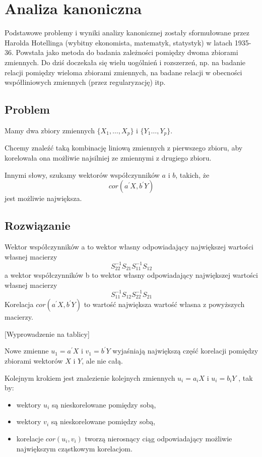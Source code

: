 \documentclass[polish,]{book}
\begin{document}
\hypertarget{part_5}{%
\chapter{Analiza kanoniczna}\label{part_5}}

Podstawowe problemy i wyniki analizy kanonicznej zostały sformułowane przez Harolda Hotellinga (wybitny ekonomista, matematyk, statystyk) w latach 1935-36.
Powstała jako metoda do badania zależności pomiędzy dwoma zbiorami zmiennych.
Do dziś doczekała się wielu uogólnień i rozszerzeń, np. na badanie relacji pomiędzy wieloma zbiorami zmiennych, na badane relacji w obecności współliniowych
zmiennych (przez regularyzację) itp.

\hypertarget{part_51}{%
\section{Problem}\label{part_51}}

Mamy dwa zbiory zmiennych \(\{X_1,\dots,X_p\}\) i \(\{Y_1\dots,Y_p\}\).

Chcemy znaleźć taką kombinację liniową zmiennych z pierwszego zbioru, aby
korelowała ona możliwie najsilniej ze zmiennymi z drugiego zbioru.

Innymi słowy, szukamy wektorów współczynników \(a\) i \(b\), takich, że
\[cor(a^{\prime}X,b^{\prime}Y)\]
jest możliwie największa.

\hypertarget{part_52}{%
\section{Rozwiązanie}\label{part_52}}

Wektor współczynników a to wektor własny odpowiadający największej wartości
własnej macierzy
\[S^{-1}_{22}S_{21}S^{-1}_{11}S_{12}\]
a wektor współczynników b to wektor własny odpowiadający największej wartości
własnej macierzy
\[S^{-1}_{11}S_{12}S^{-1}_{22}S_{21}\]
Korelacja \(cor(a^{\prime}X,b^{\prime}Y)\) to wartość największa wartość własna z powyższych macierzy.

{[}Wyprowadzenie na tablicy{]}

Nowe zmienne \(u_1=a^{\prime}X\) i \(v_1=b^{\prime}Y\) wyjaśniają największą część korelacji pomiędzy zbiorami wektorów \(X\) i \(Y\), ale nie całą.

Kolejnym krokiem jest znalezienie kolejnych zmiennych \(u_i=a_{i}X\) i \(u_i=b_iY\) , tak by:

\begin{itemize}
\item
  wektory \(u_i\) są nieskorelowane pomiędzy sobą,
\item
  wektory \(v_i\) są nieskorelowane pomiędzy sobą,
\item
  korelacje \(cor(u_i,v_i)\) tworzą nierosnący ciąg odpowiadający możliwie największym cząstkowym korelacjom.
\end{itemize}
\end{document}
